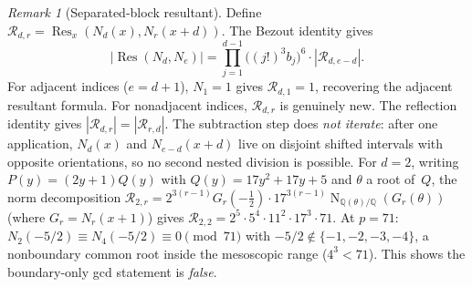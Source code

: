 \documentclass[11pt]{article}
\theoremstyle{definition}
\theoremstyle{remark}
\newtheorem{remark}[theorem]{Remark}
\begin{document}
\begin{remark}[Separated-block resultant]\label{rem:sep-res}
Define
$\mathcal{R}_{d,r} = \operatorname{Res}_x(N_d(x), N_r(x+d))$.
The Bezout identity gives
\[
|\operatorname{Res}(N_d, N_e)|
= \prod_{j=1}^{d-1}\bigl((j!)^3 b_j\bigr)^6
\cdot |\mathcal{R}_{d,e-d}|.
\]
For adjacent indices ($e = d+1$), $N_1 = 1$ gives
$\mathcal{R}_{d,1} = 1$, recovering the adjacent resultant formula.
For nonadjacent indices, $\mathcal{R}_{d,r}$ is genuinely new.
The reflection identity gives $|\mathcal{R}_{d,r}| = |\mathcal{R}_{r,d}|$.
The subtraction step does \emph{not iterate}: after one
application, $N_d(x)$ and $N_{e-d}(x+d)$ live on disjoint
shifted intervals with opposite orientations, so no second
nested division is possible.
For $d = 2$, writing $P(y) = (2y+1) Q(y)$ with $Q(y) =
17y^2 + 17y + 5$ and $\theta$ a root of~$Q$, the norm
decomposition
$\mathcal{R}_{2,r} = 2^{3(r-1)} G_r(-\tfrac{1}{2}) \cdot
17^{3(r-1)} \operatorname{N}_{\mathbb{Q}(\theta)/\mathbb{Q}}
(G_r(\theta))$ (where $G_r = N_r(x+1)$) gives
$\mathcal{R}_{2,2} = 2^5 \cdot 5^4 \cdot 11^2 \cdot
17^3 \cdot 71$.
At $p = 71$: $N_2(-5/2) \equiv N_4(-5/2) \equiv 0 \pmod{71}$
with $-5/2 \not\in \{-1,-2,-3,-4\}$, a nonboundary common root
inside the mesoscopic range ($4^3 < 71$).
This shows the boundary-only gcd statement is \emph{false}.
\end{remark}
\end{document}
